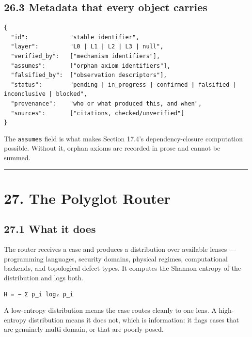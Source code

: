 \documentclass[
  11pt]{report}
\begin{document}
\hypertarget{metadata-that-every-object-carries}{%
\section{26.3 Metadata that every object
carries}\label{metadata-that-every-object-carries}}

\begin{verbatim}
{
  "id":            "stable identifier",
  "layer":         "L0 | L1 | L2 | L3 | null",
  "verified_by":   ["mechanism identifiers"],
  "assumes":       ["orphan axiom identifiers"],
  "falsified_by":  ["observation descriptors"],
  "status":        "pending | in_progress | confirmed | falsified | inconclusive | blocked",
  "provenance":    "who or what produced this, and when",
  "sources":       ["citations, checked/unverified"]
}
\end{verbatim}

The \texttt{assumes} field is what makes Section 17.4's
dependency-closure computation possible. Without it, orphan axioms are
recorded in prose and cannot be summed.

\begin{center}\rule{0.5\linewidth}{0.5pt}\end{center}

\hypertarget{the-polyglot-router}{%
\chapter{27. The Polyglot Router}\label{the-polyglot-router}}

\hypertarget{what-it-does}{%
\section{27.1 What it does}\label{what-it-does}}

The router receives a case and produces a distribution over available
lenses --- programming languages, security domains, physical regimes,
computational backends, and topological defect types. It computes the
Shannon entropy of the distribution and logs both.

\begin{verbatim}
H = − Σ p_i log₂ p_i
\end{verbatim}

A low-entropy distribution means the case routes cleanly to one lens. A
high-entropy distribution means it does not, which is information: it
flags cases that are genuinely multi-domain, or that are poorly posed.
\end{document}
